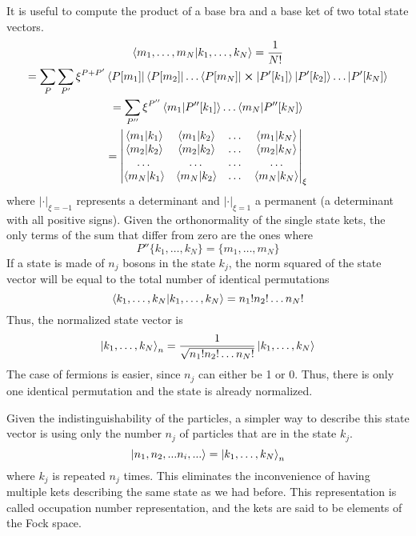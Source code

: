It is useful to compute the product of a base bra and a base ket of two total state vectors.
\begin{multline} \label{eq:base_product}
    \bra{m_1, \dots, m_N} \ket{k_1, \dots, k_N} = \frac{1}{N!}
    \\ = \sum_P \sum_{P'} \xi^{P+P'} \bra{P[m_1]}\bra{P[m_2]}\dots\bra{P[m_N]} \cross \ket{P'[k_1]}\ket{P'[k_2]}\dots\ket{P'[k_N]}
    \\ = \sum_{P''} \xi^{P''} \braket{m_1}{P''[k_1]} \dots \braket{m_N}{P''[k_N]}
    \\ = \begin{vmatrix}
        \braket{m_1}{k_1} & \braket{m_1}{k_2} & \dots & \braket{m_1}{k_N} \\
        \braket{m_2}{k_2} & \braket{m_2}{k_2} & \dots & \braket{m_2}{k_N} \\
        \dots             & \dots             & \dots & \dots             \\
        \braket{m_N}{k_1} & \braket{m_N}{k_2} & \dots & \braket{m_N}{k_N}
    \end{vmatrix}_\xi
\end{multline}
where $|\cdot|_{\xi = -1}$ represents a determinant and $|\cdot|_{\xi = 1}$ a permanent (a determinant with all positive signs). Given the orthonormality of the single state kets, the only terms of the sum that differ from zero are the ones where
\begin{equation}
    P''\{k_1, \dots, k_N\} = \{m_1, \dots, m_N\}
\end{equation}
If a state is made of $n_j$ bosons in the state $k_j$, the norm squared of the state vector will be equal to the total number of identical permutations
\begin{equation}
    \braket{k_1, \dots, k_N} = n_1!n_2!\dots n_N!
\end{equation}
Thus, the normalized state vector is
\begin{equation}
    \ket{k_1, \dots, k_N}_n= \frac{1}{\sqrt{n_1!n_2!\dots n_N!}} \ket{k_1, \dots, k_N}
\end{equation}
The case of fermions is easier, since $n_j$ can either be 1 or 0. Thus, there is only one identical permutation and the state is already normalized.

Given the indistinguishability of the particles, a simpler way to describe this state vector is using only the number $n_j$ of particles that are in the state $k_j$.
\begin{equation} \label{eq:occupation_definition}
    \ket{n_1, n_2, ... n_i, ...} = \ket{k_1, \dots, k_N}_n
\end{equation}
where $k_j$ is repeated $n_j$ times. This eliminates the inconvenience of having multiple kets describing the same state as we had before. This representation is called occupation number representation, and the kets are said to be elements of the Fock space.

